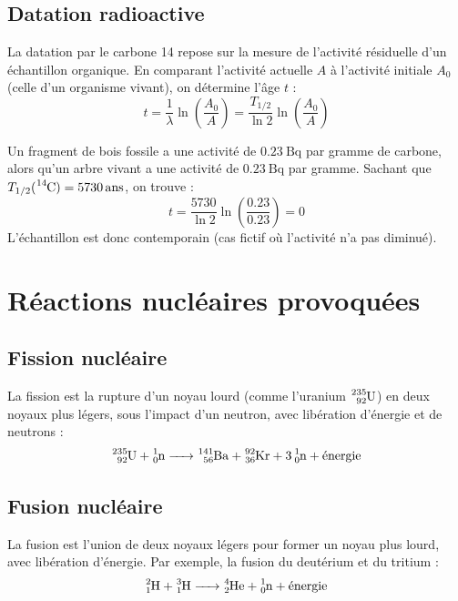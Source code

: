 \subsection{Datation radioactive}
La datation par le carbone 14 repose sur la mesure de l'activité résiduelle d'un échantillon organique. En comparant l'activité actuelle $A$ à l'activité initiale $A_0$ (celle d'un organisme vivant), on détermine l'âge $t$ :
\[t = \frac{1}{\lambda} \ln\left(\frac{A_0}{A}\right) = \frac{T_{1/2}}{\ln 2} \ln\left(\frac{A_0}{A}\right)\]

\begin{exemple}
Un fragment de bois fossile a une activité de $\SI{0.23}{\becquerel}$ par gramme de carbone, alors qu'un arbre vivant a une activité de $\SI{0.23}{\becquerel}$ par gramme. Sachant que $T_{1/2}(\ce{^{14}C}) = \SI{5730}{ans}$, on trouve :
\[t = \frac{5730}{\ln 2} \ln\left(\frac{0.23}{0.23}\right) = 0\]
L'échantillon est donc contemporain (cas fictif où l'activité n'a pas diminué).
\end{exemple}

\section{Réactions nucléaires provoquées}

\subsection{Fission nucléaire}
\begin{definition}[Fission]
La fission est la rupture d'un noyau lourd (comme l'uranium $\ce{^{235}_{92}U}$) en deux noyaux plus légers, sous l'impact d'un neutron, avec libération d'énergie et de neutrons :
\[\ce{^{235}_{92}U + ^{1}_{0}n -> ^{141}_{56}Ba + ^{92}_{36}Kr + 3 ^{1}_{0}n + \text{énergie}}\]
\end{definition}

\subsection{Fusion nucléaire}
\begin{definition}[Fusion]
La fusion est l'union de deux noyaux légers pour former un noyau plus lourd, avec libération d'énergie. Par exemple, la fusion du deutérium et du tritium :
\[\ce{^{2}_{1}H + ^{3}_{1}H -> ^{4}_{2}He + ^{1}_{0}n + \text{énergie}}\]
\end{definition}

